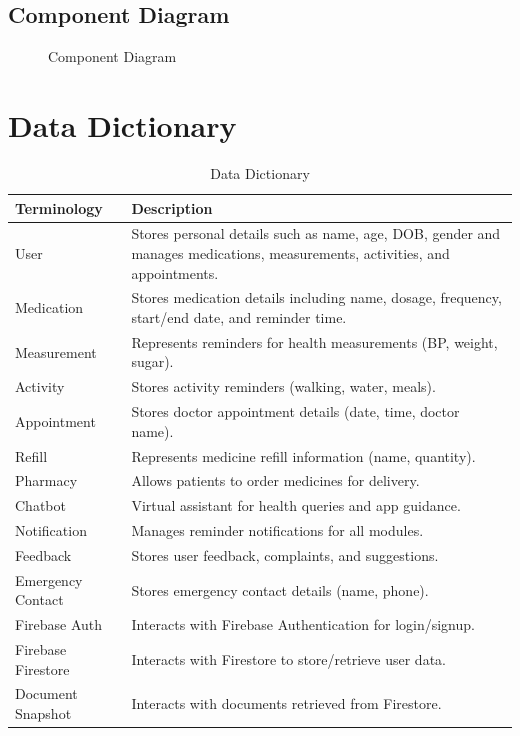 \documentclass[12pt, a4paper, oneside]{report}
\begin{document}
\subsection{Component Diagram}

\begin{figure}[H]
\centering
\caption{Component Diagram}
\label{fig:component-diagram}
\end{figure}

\section{Data Dictionary}

\begin{table}[H]
\centering
\caption{Data Dictionary}
\label{tab:data-dictionary}
\begin{tabularx}{\textwidth}{|l|X|}
\hline
\textbf{Terminology} & \textbf{Description} \\ \hline
User & Stores personal details such as name, age, DOB, gender and manages medications, measurements, activities, and appointments. \\ \hline
Medication & Stores medication details including name, dosage, frequency, start/end date, and reminder time. \\ \hline
Measurement & Represents reminders for health measurements (BP, weight, sugar). \\ \hline
Activity & Stores activity reminders (walking, water, meals). \\ \hline
Appointment & Stores doctor appointment details (date, time, doctor name). \\ \hline
Refill & Represents medicine refill information (name, quantity). \\ \hline
Pharmacy & Allows patients to order medicines for delivery. \\ \hline
Chatbot & Virtual assistant for health queries and app guidance. \\ \hline
Notification & Manages reminder notifications for all modules. \\ \hline
Feedback & Stores user feedback, complaints, and suggestions. \\ \hline
Emergency Contact & Stores emergency contact details (name, phone). \\ \hline
Firebase Auth & Interacts with Firebase Authentication for login/signup. \\ \hline
Firebase Firestore & Interacts with Firestore to store/retrieve user data. \\ \hline
Document Snapshot & Interacts with documents retrieved from Firestore. \\ \hline
\end{tabularx}
\end{table}
\end{document}

